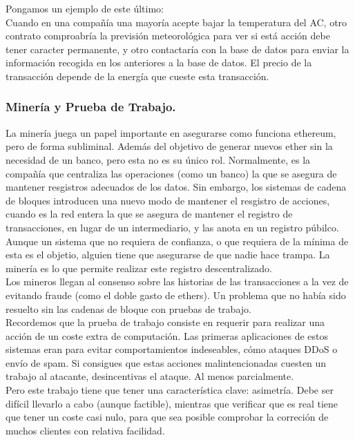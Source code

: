 \documentclass[11pt,a4paper]{article}
\begin{document}
Pongamos un  ejemplo de este último:\\

Cuando en una compañía una mayoría acepte bajar la temperatura del AC, otro contrato comproabría la previsión meteorológica para ver si está acción debe tener caracter permanente, y otro contactaría con la base de datos para enviar la información recogida en los anteriores a la base de datos. El precio de la transacción depende de la energía que cueste esta transacción.

\subsubsection{Minería y Prueba de Trabajo.}

La minería juega un papel importante en asegurarse como funciona ethereum, pero de forma subliminal. Además del objetivo de generar nuevos ether sin la necesidad de un banco, pero esta no es su único rol. Normalmente, es la compañía que centraliza las operaciones (como un banco) la que se asegura de mantener resgistros adecuados de los datos. Sin embargo, los sistemas de cadena de bloques introducen una nuevo modo de mantener el resgistro de acciones, cuando es la red entera la que se asegura de mantener el registro de transacciones, en lugar de un intermediario, y las anota en un registro púbilco.\\ 

Aunque un sistema que no requiera de confianza, o que requiera de la mínima de esta es el objetio, alguien tiene que asegurarse de que nadie hace trampa. La minería es lo que permite realizar este registro descentralizado. \\

Los mineros llegan al consenso sobre las historias de las transacciones a la vez de evitando fraude (como el doble gasto de ethers). Un problema que no había sido resuelto sin las cadenas de bloque con pruebas de trabajo.\\

Recordemos que la prueba de trabajo consiste en requerir para realizar una acción de un coste extra de computación. Las primeras aplicaciones de estos sistemas eran para evitar comportamientos indeseables, cómo ataques DDoS o envío de spam. Si consigues que estas acciones malintencionadas cuesten un trabajo al atacante, desincentivas el ataque. Al menos parcialmente.\\

Pero este trabajo tiene que tener una característica clave: asimetría. Debe ser difícil llevarlo a cabo (aunque factible), mientras que verificar que es real tiene que tener un coste casi nulo, para que sea posible comprobar la correción de muchos clientes con relativa facilidad.\\
\end{document}

